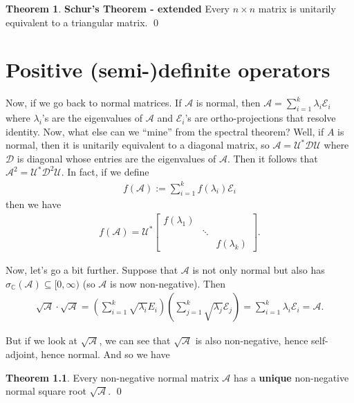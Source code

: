 \documentclass{book}
\theoremstyle{definition}
\newtheorem{thm}{Theorem}[section]
\newcommand{\C}{\mathbb{C}}
\newcommand{\Uni}{\mathcal{U}}
\newcommand{\A}{\mathcal{A}}
\newcommand{\E}{\mathcal{E}}
\newcommand{\lp}{\left(}
\newcommand{\rp}{\right)}
\begin{document}
\begin{thm}\textbf{Schur's Theorem - extended}
	Every $n\times n$ matrix is unitarily equivalent to a triangular matrix. \qed
\end{thm}






\newpage 

\chapter{Positive (semi-)definite operators}

Now, if we go back to normal matrices. If $\A$ is normal, then $\A = \sum^k_{i=1}\lambda_i \E_i$ where $\lambda_i$'s are the eigenvalues of $\A$ and $\E_i$'s are ortho-projections that resolve identity. Now, what else can we ``mine'' from the spectral theorem? Well, if $A$ is normal, then it is unitarily equivalent to a diagonal matrix, so $\A = \Uni^* \mathcal{D} \Uni$ where $\mathcal{D}$ is diagonal whose entries are the eigenvalues of $\A$. Then it follows that $\A^2 = \Uni^* \mathcal{D}^2 \Uni$. In fact, if we define
\begin{align*}
f(\A) := \sum^k_{i=1}f(\lambda_i)\E_i
\end{align*}
then we have 
\begin{align*}
f(\A) = \Uni^* \begin{bmatrix}
f(\lambda_1) && \\
& \ddots & \\
& & f(\lambda_k)
\end{bmatrix}.
\end{align*}


Now, let's go a bit further. Suppose that $\A$ is not only normal but also has $\sigma_\C(\A) \subseteq [0,\infty)$ (so $\A$ is now non-negative). Then 
\begin{align*}
\sqrt{\A}\cdot \sqrt{\A} = \lp \sum^k_{i=1}\sqrt{\lambda_i} E_i \rp \lp \sum^k_{j=1}\sqrt{\lambda_j}\E_j  \rp = \sum^k_{i=1}\lambda_i\E_i = \A.
\end{align*}

But if we look at $\sqrt{\A}$, we can see that $\sqrt{\A}$ is also non-negative, hence self-adjoint, hence normal. And so we have

\begin{thm}
	Every non-negative normal matrix $\A$ has a \textbf{unique} non-negative normal square root $\sqrt{\A}$. \qed
\end{thm}
\end{document}
